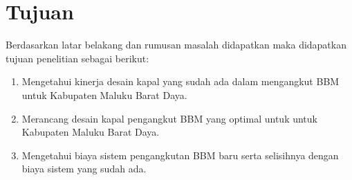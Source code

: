 \section{Tujuan}
\label{sec:Tujuan}

Berdasarkan latar belakang dan rumusan masalah didapatkan maka didapatkan tujuan penelitian sebagai berikut:
\begin{enumerate}
  \item Mengetahui kinerja desain kapal yang sudah ada dalam mengangkut BBM untuk Kabupaten Maluku Barat Daya.
  \item Merancang desain kapal pengangkut BBM yang  optimal untuk untuk Kabupaten Maluku Barat Daya.
  \item Mengetahui biaya sistem pengangkutan BBM baru serta selisihnya dengan biaya sistem yang sudah ada.
\end{enumerate}
